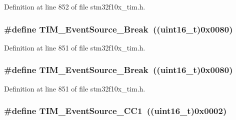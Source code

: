 Definition at line 852 of file stm32f10x\+\_\+tim.\+h.

\subsubsection[{\texorpdfstring{T\+I\+M\+\_\+\+Event\+Source\+\_\+\+Break}{TIM_EventSource_Break}}]{\setlength{\rightskip}{0pt plus 5cm}\#define T\+I\+M\+\_\+\+Event\+Source\+\_\+\+Break~(({\bf uint16\+\_\+t})0x0080)}\hypertarget{group___t_i_m___event___source_gad6f9b5366d93c73ff005273c50c9f00a}{}\label{group___t_i_m___event___source_gad6f9b5366d93c73ff005273c50c9f00a}


Definition at line 851 of file stm32f10x\+\_\+tim.\+h.

\subsubsection[{\texorpdfstring{T\+I\+M\+\_\+\+Event\+Source\+\_\+\+Break}{TIM_EventSource_Break}}]{\setlength{\rightskip}{0pt plus 5cm}\#define T\+I\+M\+\_\+\+Event\+Source\+\_\+\+Break~(({\bf uint16\+\_\+t})0x0080)}\hypertarget{group___t_i_m___event___source_gad6f9b5366d93c73ff005273c50c9f00a}{}\label{group___t_i_m___event___source_gad6f9b5366d93c73ff005273c50c9f00a}


Definition at line 851 of file stm32f10x\+\_\+tim.\+h.

\subsubsection[{\texorpdfstring{T\+I\+M\+\_\+\+Event\+Source\+\_\+\+C\+C1}{TIM_EventSource_CC1}}]{\setlength{\rightskip}{0pt plus 5cm}\#define T\+I\+M\+\_\+\+Event\+Source\+\_\+\+C\+C1~(({\bf uint16\+\_\+t})0x0002)}\hypertarget{group___t_i_m___event___source_gaa634c46d4ac521ad16e25be97b487e8a}{}\label{group___t_i_m___event___source_gaa634c46d4ac521ad16e25be97b487e8a}



